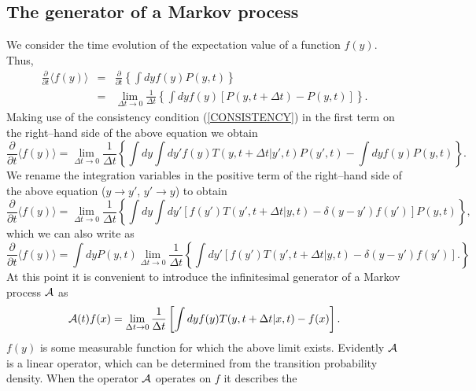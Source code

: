\subsection{The generator of a Markov process}
We consider the time evolution of the expectation value
of  a function $f(y)$.
Thus,
\begin{eqnarray*}
\frac{\partial}{\partial t} \langle f(y) \rangle &=&
 \frac{\partial}{\partial t} 
    \left\{  \int dy f(y) P(y,t)  \right\}  \\
 &= & \lim_{\Delta t \rightarrow 0} \frac{1}{\Delta t}
       \left\{  \int dy f(y) \left[P(y,t+\Delta t) - P(y,t) \right]  
       \right\}.
\end{eqnarray*}
Making use of the consistency condition (\ref{CONSISTENCY}) 
in the first term 
on the right--hand side of the above equation we obtain
\begin{equation*}
\frac{\partial}{\partial t} \langle f(y) \rangle =
   \lim_{\Delta t \rightarrow 0} \frac{1}{\Delta t}
    \left\{  \int dy \int dy' f(y) T(y,t+\Delta t|y',t) P(y',t) 
         - \int dy f(y) P(y,t) 
       \right\}.
\end{equation*}
We rename the integration variables in the positive 
term of the right--hand side of the above equation ($y \rightarrow y'$,
$y' \rightarrow y$) to obtain
\begin{equation*}
\frac{\partial}{\partial t} \langle f(y) \rangle =
   \lim_{\Delta t \rightarrow 0} \frac{1}{\Delta t}
    \left\{  \int dy  \int dy' \left[ f(y') T(y',t+\Delta t|y,t) 
         - \delta(y-y') f(y') \right] P(y,t) 
       \right\},
\end{equation*}
which we can also write as
\begin{equation*}
\frac{\partial}{\partial t} \langle f(y) \rangle =
\int dy P(y,t) \lim_{\Delta t \rightarrow 0} \frac{1}{\Delta t}
\left\{ \int dy' \left[ f(y') T(y',t+\Delta t|y,t) 
         - \delta(y-y') f(y') \right].
\right\}
\end{equation*}
At this point it is convenient to introduce the infinitesimal 
generator of a Markov process ${\cal{A}}$ as
\begin{equation}
\label{DEF_GENERATOR}
{\cal{A}}(t) f(x) = \lim_{\Delta t \rightarrow 0}
    \frac{1}{\Delta t} 
    \left[\int dy f(y)T(y,t+\Delta t|x,t) - f(x)  \right].
\end{equation}
$f(y)$ is some measurable function for which the above 
limit exists. Evidently ${\cal{A}}$ is a linear operator, which 
can be determined from the transition probability density. 
When the operator ${\cal{A}}$ operates on $f$ it describes the
